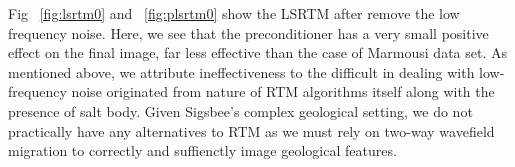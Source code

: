
Fig ~\ref{fig:lsrtm0} and ~\ref{fig:plsrtm0} show the LSRTM after remove the low frequency noise. Here, we see that the preconditioner has a very small positive effect on the final image, far less effective than the case of Marmousi data set. As mentioned above, we attribute ineffectiveness to the difficult in dealing with low-frequency noise originated from nature of RTM algorithms itself along with the presence of salt body. Given Sigsbee's complex geological setting, we do not practically have any alternatives to RTM as we must rely on two-way wavefield migration to correctly and suffienctly image geological features.